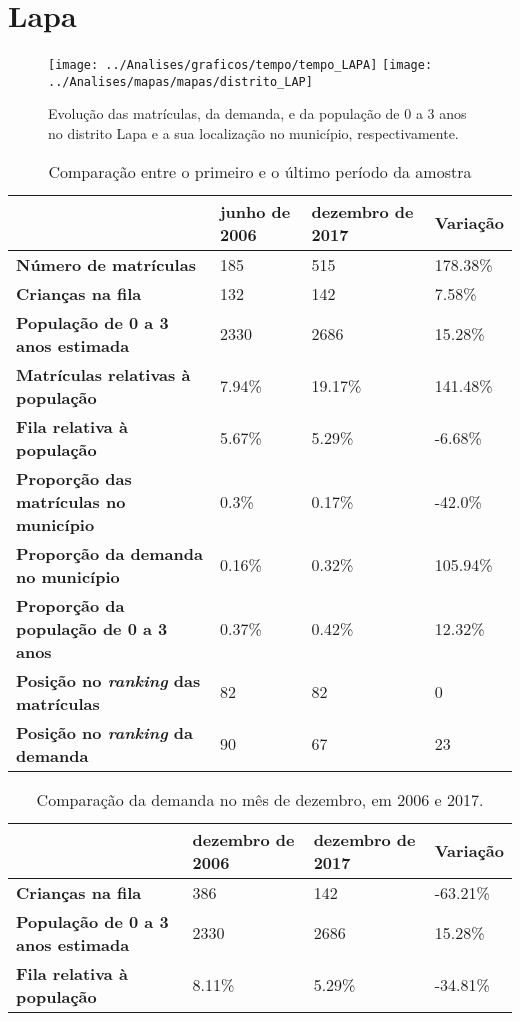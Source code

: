 \section{Lapa}
\begin{figure}[H]
	\centering
	\texttt{[image: ../Analises/graficos/tempo/tempo\_LAPA]}
	\texttt{[image: ../Analises/mapas/mapas/distrito\_LAP]}
	\caption{Evolução das matrículas, da demanda, e da população de 0 a 3 anos no distrito Lapa e a sua localização no município, respectivamente.}
\end{figure}
\begin{table}[H]
	\begin{tabular}{|l|l|l|l|}
		\hline
		\textbf{}                                      & \textbf{junho de 2006}       & \textbf{dezembro de 2017}    & \textbf{Variação} \\ \hline
		\textbf{Número de matrículas}                  & 185 & 515 & 178.38\% \\ \hline
		\textbf{Crianças na fila}                      & 132 & 142 & 7.58\% \\ \hline
		\textbf{População de 0 a 3 anos estimada}      & 2330 & 2686 & 15.28\% \\ \hline
		\textbf{Matrículas relativas à população}      & 7.94\% & 19.17\% & 141.48\% \\ \hline
		\textbf{Fila relativa à população}             & 5.67\% & 5.29\% & -6.68\% \\ \hline
		\textbf{Proporção das matrículas no município} & 0.3\% & 0.17\% & -42.0\% \\ \hline
		\textbf{Proporção da demanda no município}     & 0.16\% & 0.32\% & 105.94\% \\ \hline
		\textbf{Proporção da população de 0 a 3 anos}  & 0.37\% & 0.42\% & 12.32\% \\ \hline
		\textbf{Posição no \textit{ranking} das matrículas}     & 82 & 82 & 0 \\ \hline
		\textbf{Posição no \textit{ranking} da demanda}         & 90 & 67 & 23 \\ \hline
	\end{tabular}
	\caption{Comparação entre o primeiro e o último período da amostra}
\end{table}
\begin{table}[H]
	\begin{tabular}{|l|l|l|l|}
		\hline
		\textbf{}                                 & \textbf{dezembro de 2006} & \textbf{dezembro de 2017} & \textbf{Variação} \\ \hline
		\textbf{Crianças na fila}                      & 386 & 142 & -63.21\% \\ \hline
		\textbf{População de 0 a 3 anos estimada}      & 2330 & 2686 & 15.28\% \\ \hline
		\textbf{Fila relativa à população}             & 8.11\% & 5.29\% & -34.81\% \\ \hline
	\end{tabular}
	\caption{Comparação da demanda no mês de dezembro, em 2006 e 2017.}
\end{table}
